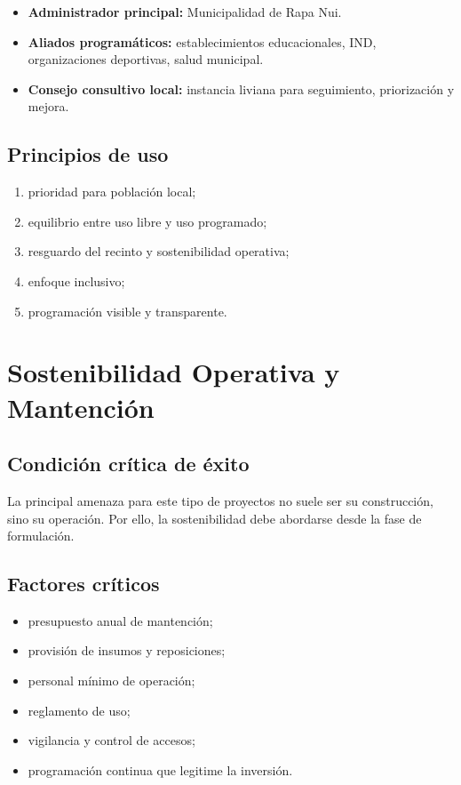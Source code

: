 \documentclass[12pt,letterpaper]{article}
\begin{document}
\begin{itemize}
    \item \textbf{Administrador principal:} Municipalidad de Rapa Nui.
    \item \textbf{Aliados programáticos:} establecimientos educacionales, IND, organizaciones deportivas, salud municipal.
    \item \textbf{Consejo consultivo local:} instancia liviana para seguimiento, priorización y mejora.
\end{itemize}

\subsection{Principios de uso}

\begin{enumerate}
    \item prioridad para población local;
    \item equilibrio entre uso libre y uso programado;
    \item resguardo del recinto y sostenibilidad operativa;
    \item enfoque inclusivo;
    \item programación visible y transparente.
\end{enumerate}

\section{Sostenibilidad Operativa y Mantención}

\subsection{Condición crítica de éxito}

La principal amenaza para este tipo de proyectos no suele ser su construcción, sino su operación. Por ello, la sostenibilidad debe abordarse desde la fase de formulación.

\subsection{Factores críticos}

\begin{itemize}
    \item presupuesto anual de mantención;
    \item provisión de insumos y reposiciones;
    \item personal mínimo de operación;
    \item reglamento de uso;
    \item vigilancia y control de accesos;
    \item programación continua que legitime la inversión.
\end{itemize}
\end{document}
